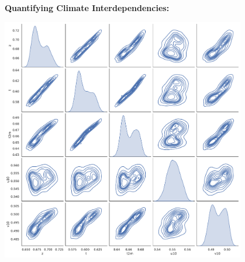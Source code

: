\documentclass[landscape,a1paper,fontscale=0.424]{baposter}
\begin{document}
\begin{poster}
{\begin{minipage}[t]{0.50\textwidth}
            \textbf{\color{blue}Quantifying Climate Interdependencies:}
            \vspace{-0.5em}
            \begin{center}
                \includegraphics[width=0.8\textwidth]{pairwise.pdf}
            \end{center}
        \end{minipage}


}
\end{poster}
\end{document}
